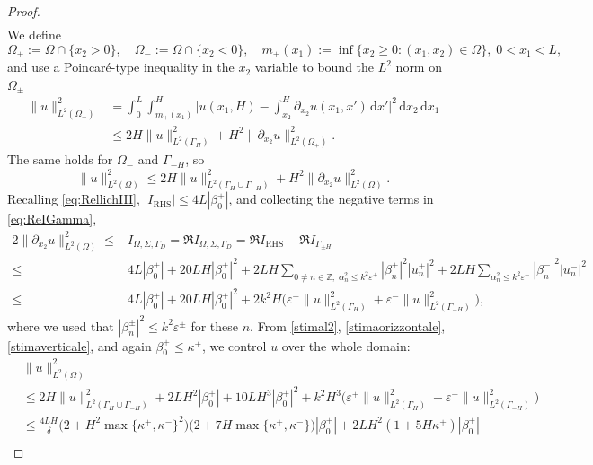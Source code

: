 \documentclass[10pt,a4paper]{amsart}
\newcommand{\IZ}{{\mathbb Z}}
\newcommand{\rd}{{\,\mathrm d}}
\newcommand{\dxt}{{\partial_{x_2}}}
\newcommand{\GD}{{\Gamma_D}}
\newcommand{\GH}{{\Gamma_H}}
\newcommand{\GmH}{{\Gamma_{-H}}}
\newcommand{\GpmH}{{\Gamma_{\pm H}}}
\begin{document}
\begin{proof}
\begin{align}
	\label{stimaorizzontale}
\end{align}
We define 
\begin{equation*}
	\Omega_+:=\Omega\cap\{x_2>0\}, \quad
	\Omega_-:=\Omega\cap\{x_2<0\}, \quad
	m_+(x_1):=\inf\{x_2\ge 0: (x_1,x_2)\in\Omega\}, \; 0<x_1<L,
\end{equation*}
and use 
a Poincaré-type inequality 
in the $x_2$ variable 
to bound the $L^2$ norm on $\Omega_\pm$
\begin{align*}
	\|u\|_{L^2(\Omega_+)}^2 & =
	\int_0^L\int_{m_+(x_1)}^H \bigg|u(x_1,H)-\int_{x_2}^H \dxt u(x_1,x')\rd x'\bigg|^2\rd x_2\rd x_1\\&
	\le 2H\|u\|_{L^2(\GH)}^2 + H^2\|\dxt u\|_{L^2(\Omega_+)}^2.
\end{align*}
The same holds for $\Omega_-$ and $\GmH$, so 
\begin{equation} \label{stimal2}
	\|u\|_{L^2(\Omega)}^2\le 2H\|u\|_{L^2(\GH\cup\GmH)}^2 + H^2\|\dxt u\|_{L^2(\Omega)}^2.
\end{equation}
Recalling \eqref{eq:RellichIII}, $|I_{\mathrm{RHS}}|\le 4L|\beta_0^+|$, and collecting the negative terms in \eqref{eq:ReIGamma},
\begin{align} \nonumber
	2\|\partial_{x_2}u\|^2_{L^2(\Omega)}
	\le&I_{\Omega, \Sigma, \GD}
	=\Re I_{\Omega, \Sigma, \GD}
	=\Re I_{\mathrm{RHS}}-\Re I_\GpmH
	\\ \nonumber
	\le &  
	4L|\beta_0^+| + 20 LH|\beta_0^+|^2 
	+2LH\!\!\sum_{0\ne n\in\IZ,\; \alpha_n^2\le k^2\varepsilon^+}|\beta_n^+|^2|u^+_n|^2 
	+2LH\sum_{\alpha_n^2\le k^2\varepsilon^-}|\beta_n^-|^2|u^-_n|^2 
	\\ \label{stimaverticale}
	\le& 4L|\beta_0^+| + 20 LH|\beta_0^+|^2 +
	2 k^2 H \Big(\varepsilon^+\|u\|_{L^2(\GH)}^2+\varepsilon^-\|u\|_{L^2(\GmH)}^2\Big)
	,\end{align}
where we used that $|\beta_n^\pm|^2\le k^2\varepsilon^\pm$ for these $n$.
From \eqref{stimal2}, \eqref{stimaorizzontale}, \eqref{stimaverticale}, and again $\beta_0^+\le\kappa^+$, we control $u$ over the whole domain:
\begin{align*} \nonumber
	&\|u\|_{L^2(\Omega)}^2\\ \nonumber
	&\le   2H\|u\|_{L^2(\GH\cup\GmH)}^2 
	+2LH^2|\beta_0^+| + 10 LH^3|\beta_0^+|^2 +
	k^2 H^3 \Big(\varepsilon^+\|u\|_{L^2(\GH)}^2+\varepsilon^-\|u\|_{L^2(\GmH)}^2\Big)
	\\ \nonumber
	&\le \frac{4LH}\delta\big(2+H^2\max\{\kappa^+,\kappa^-\}^2\big)\big(2+7H\max\{\kappa^+,\kappa^-\}\big)|\beta_0^+|
	+2LH^2(1+5H\kappa^+)|\beta_0^+|
	\\

\end{align*}
\end{proof}
\end{document}

